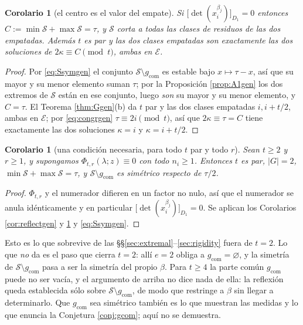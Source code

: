 \documentclass[11pt,reqno]{amsart}
\theoremstyle{plain}
\newtheorem{corollary}[theorem]{Corolario}
\theoremstyle{definition}
\begin{document}
\begin{corollary}[el centro es el valor del empate]\label{cor:Ctaugen}
Si $\bigl[\det(x_i^{\beta_j})\bigr]_{D_1}=0$ entonces $C:=\min\mathcal{S}+\max\mathcal{S}=\tau$, y
$\mathcal{S}$ corta a todas las clases de residuos de las dos empatadas. Además $t$ es par y las dos
clases empatadas son exactamente las dos soluciones de $2\kappa\equiv C\pmod t$, ambas en
$\mathcal{E}$.
\end{corollary}

\begin{proof}
Por \eqref{eq:Ssymgen} el conjunto $\mathcal{S}\setminus g_{\mathrm{com}}$ es estable bajo
$x\mapsto\tau-x$, así que su mayor y su menor elemento suman $\tau$; por la Proposición
\ref{prop:A1gen} los dos extremos de $\mathcal{S}$ están en ese conjunto, luego \emph{son} su mayor y
su menor elemento, y $C=\tau$. El Teorema \ref{thm:Ggen}(b) da $t$ par y las dos clases empatadas
$i,i+t/2$, ambas en $\mathcal{E}$; por \eqref{eq:congrgen} $\tau\equiv2i\pmod t$, así que
$2\kappa\equiv\tau=C$ tiene exactamente las dos soluciones $\kappa=i$ y $\kappa=i+t/2$.
\end{proof}

\begin{corollary}[una condición necesaria, para todo $t$ par y todo $r$]\label{cor:necgen}
Sean $t\ge2$ y $r\ge1$, y supongamos $\Phi_{t,r}(\lambda;z)\equiv0$ con todo $n_i\ge1$. Entonces $t$
es par, $|G|=2$, $\min\mathcal{S}+\max\mathcal{S}=\tau$, y $\mathcal{S}\setminus g_{\mathrm{com}}$ es
simétrico respecto de $\tau/2$.
\end{corollary}

\begin{proof}
$\Phi_{t,r}$ y el numerador difieren en un factor no nulo, así que el numerador se anula
idénticamente y en particular $\bigl[\det(x_i^{\beta_j})\bigr]_{D_1}=0$. Se aplican los Corolarios
\ref{cor:reflectgen} y \ref{cor:Ctaugen} y \eqref{eq:Ssymgen}.
\end{proof}

\noindent Esto es lo que sobrevive de las \S\S\ref{sec:extremal}--\ref{sec:rigidity} fuera de $t=2$.
Lo que \emph{no} da es el paso que cierra $t=2$: allí $e=2$ obliga a $g_{\mathrm{com}}=\varnothing$, y
la simetría de $\mathcal{S}\setminus g_{\mathrm{com}}$ pasa a ser la simetría del propio $\beta$. Para
$t\ge4$ la parte común $g_{\mathrm{com}}$ puede no ser vacía, y el argumento de arriba no dice nada
de ella: la reflexión queda establecida sólo sobre $\mathcal{S}\setminus g_{\mathrm{com}}$, de modo
que restringe a $\beta$ sin llegar a determinarlo. Que $g_{\mathrm{com}}$ sea simétrico también es lo
que muestran las medidas y lo que enuncia la Conjetura \ref{conj:gcom}; aquí no se demuestra.
\end{document}
